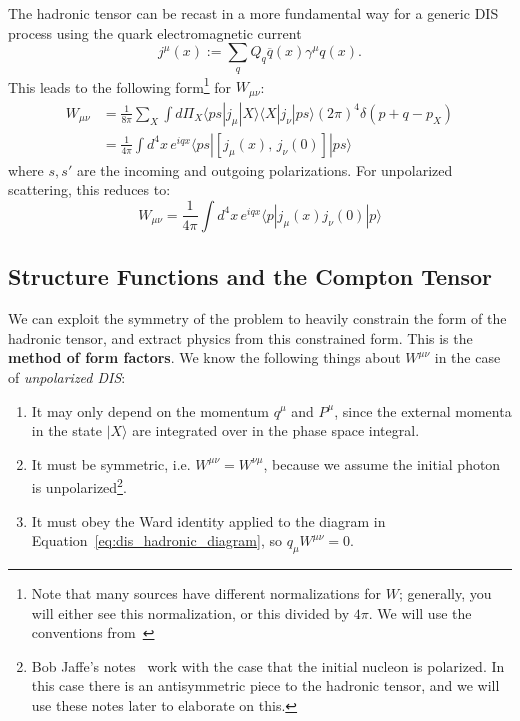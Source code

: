 \documentclass[11pt, oneside]{article}   	%
\theoremstyle{definition}
\begin{document}
The hadronic tensor can be recast in a more fundamental way for a generic DIS process using the quark electromagnetic 
current 
\begin{equation}
	j^\mu(x) := \sum_q Q_q \overline{q}(x) \gamma^\mu q(x).
\end{equation}
This leads to the following form\footnote{Note that many sources have different normalizations for $W$; generally, you will 
either see this normalization, or this divided by $4\pi$. We will use the conventions from~\cite{quarks_gluons}} for 
$W_{\mu\nu}$:
\begin{align}
	W_{\mu\nu} &= \frac{1}{8\pi} \sum_X\int d\Pi_X \langle ps | j_\mu | X\rangle \langle X | j_\nu | ps \rangle (2\pi)^4 \delta(p + q - 
	p_X)	%
	\nonumber \\
	&= \frac{1}{4\pi}\int d^4 x\, e^{iqx} \langle ps | [j_\mu(x),\, j_\nu(0)] | ps\rangle
\end{align}
where $s, s'$ are the incoming and outgoing polarizations. For unpolarized scattering, this reduces to:
\begin{equation}
	W_{\mu\nu} = \frac{1}{4\pi}\int d^4 x\, e^{iqx} \langle p | j_\mu(x) j_\nu(0) | p\rangle
\end{equation}

\subsection{Structure Functions and the Compton Tensor}

We can exploit the symmetry of the problem to heavily constrain the form of the hadronic tensor, and 
extract physics from this constrained form. This is the \textbf{method of form factors}. We know the following things about 
$W^{\mu\nu}$ in the case of \textit{unpolarized DIS}:
\begin{enumerate}
	\item It may only depend on the momentum $q^\mu$ and $P^\mu$, since the external momenta in the state $|X\rangle$ 
	are integrated over in the phase space integral. 
	\item It must be symmetric, i.e. $W^{\mu\nu} = W^{\nu\mu}$, because we assume the initial photon is 
	unpolarized\footnote{Bob Jaffe's notes~\cite{jaffe} work with the case that the initial nucleon is polarized. In this case 
	there is an antisymmetric piece to the hadronic tensor, and we will use these notes later to elaborate on this.}. 
	\item It must obey the Ward identity applied to the diagram in Equation~\ref{eq:dis_hadronic_diagram}, so $q_\mu W^{\mu\nu} = 0$. 
\end{enumerate}
\end{document}
